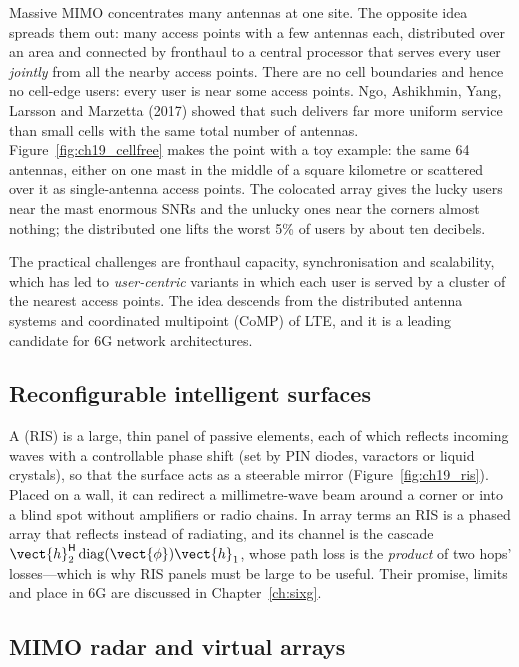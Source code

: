 Massive MIMO concentrates many antennas at one site. The opposite idea spreads them out: many
access points with a few antennas each, distributed over an area and connected by fronthaul to a
central processor that serves every user \emph{jointly} from all the nearby access points. There are
no cell boundaries and hence no cell-edge users: every user is near some access points. Ngo,
Ashikhmin, Yang, Larsson and Marzetta (2017) showed that such  delivers
far more uniform service than small cells with the same total number of antennas.
Figure~\ref{fig:ch19_cellfree} makes the point with a toy example: the same 64 antennas, either on
one mast in the middle of a square kilometre or scattered over it as single-antenna access points.
The colocated array gives the lucky users near the mast enormous SNRs and the unlucky ones near the
corners almost nothing; the distributed one lifts the worst 5\% of users by about ten decibels.

The practical challenges are fronthaul capacity, synchronisation and scalability, which has led to
\emph{user-centric} variants in which each user is served by a cluster of the nearest access points.
The idea descends from the distributed antenna systems and coordinated multipoint (CoMP) of LTE, and
it is a leading candidate for 6G network architectures.

\subsection{Reconfigurable intelligent surfaces}

A  (RIS) is a large, thin panel of passive elements, each of
which reflects incoming waves with a controllable phase shift (set by PIN diodes, varactors or liquid
crystals), so that the surface acts as a steerable mirror (Figure~\ref{fig:ch19_ris}). Placed on a
wall, it can redirect a millimetre-wave beam around a corner or into a blind spot without amplifiers
or radio chains. In array terms an RIS is a phased array that reflects instead of radiating, and its
channel is the cascade $\vect{h}_2^{\mathsf H}\operatorname{diag}(\vect{\phi})\vect{h}_1$, whose path
loss is the \emph{product} of two hops' losses---which is why RIS panels must be large to be useful.
Their promise, limits and place in 6G are discussed in Chapter~\ref{ch:sixg}.

\subsection{MIMO radar and virtual arrays}

